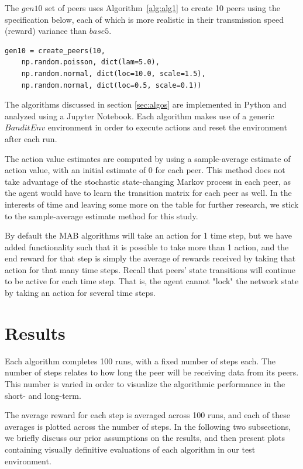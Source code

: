 \documentclass{article}
\begin{document}
The $gen10$ set of peers uses Algorithm~\ref{alg:alg1} to create 10 peers using the specification below, each of which is more realistic in their transmission 
speed (reward) variance than $base5$.
\begin{lstlisting}
gen10 = create_peers(10, 
    np.random.poisson, dict(lam=5.0), 
    np.random.normal, dict(loc=10.0, scale=1.5), 
    np.random.normal, dict(loc=0.5, scale=0.1))
\end{lstlisting}

The algorithms discussed in section \ref{sec:algos} are implemented in Python and analyzed using a Jupyter Notebook. Each algorithm makes use of a generic $BanditEnv$ 
environment in order to execute actions and reset the environment after each run. 

The action value estimates are computed by using a sample-average estimate of action value, with an initial estimate of 0 for each peer. This method does not take 
advantage of the stochastic state-changing Markov process in each peer, as the agent would have to learn the transition matrix for each peer as well. In the interests of 
time and leaving some more on the table for further research, we stick to the sample-average estimate method for this study.

By default the MAB algorithms will take an action for 1 time step, but we have added functionality such that it is possible to take more than 1 action, and the end reward 
for that step is simply the average of rewards received by taking that action for that many time steps. Recall that peers' state transitions will continue to be active 
for each time step. That is, the agent cannot "lock" the network state by taking an action for several time steps. 

\section{Results}
Each algorithm completes 100 runs, with a fixed number of steps each. The number of steps relates to how long the peer will be receiving data from its peers. This number is 
varied in order to visualize the algorithmic performance in the short- and long-term. 

The average reward for each step is averaged across 100 runs, and each of these averages is plotted across the number of steps. In the following two subsections, we briefly 
discuss our prior assumptions on the results, and then present plots containing visually definitive evaluations of each algorithm in our test environment.
\end{document}
